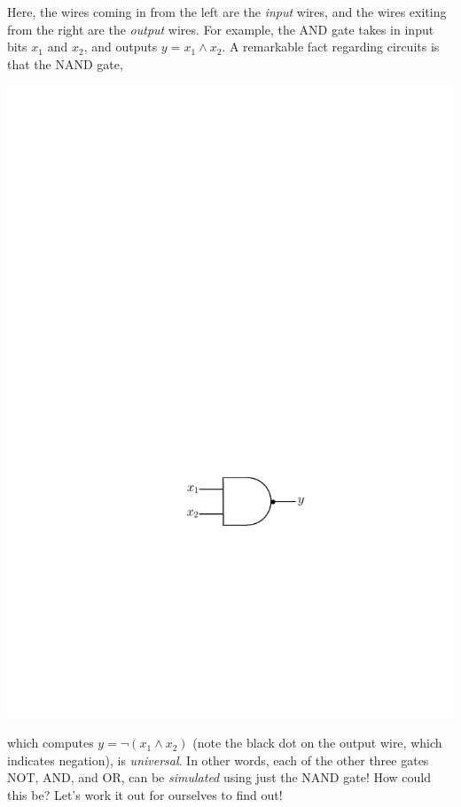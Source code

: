 \documentclass[11pt]{article}
\begin{document}
\begin{enumerate}
\begin{center}
\end{center}
Here, the wires coming in from the left are the \emph{input} wires, and the wires exiting from the right are the \emph{output} wires. For example, the AND gate takes in input bits $x_1$ and $x_2$, and outputs $y=x_1\wedge x_2$. A remarkable fact regarding circuits is that the NAND gate,
\begin{center}
\includegraphics[scale = 0.7]{NAND.pdf}
\end{center}
which computes $y=\neg(x_1\wedge x_2)$ (note the black dot on the output wire, which indicates negation), is \emph{universal}. In other words, each of the other three gates NOT, AND, and OR, can be \emph{simulated} using just the NAND gate! How could this be? Let's work it out for ourselves to find out!


\end{enumerate}
\end{document}
